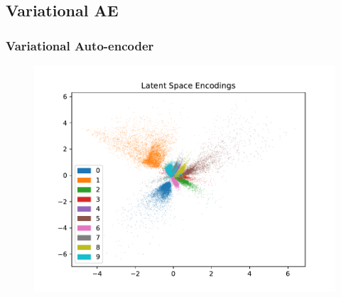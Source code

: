 \documentclass[10pt, usenames, dvipsnames, table]{beamer}
\begin{document}

\subsection{Variational AE}


\begin{frame}
  \frametitle{Variational Auto-encoder}
  \begin{figure}
    \centering
    \includegraphics[width=\linewidth]
    {models/mnist_vae_e300_L2_b64/encodings}
    \caption{}
    \label{}
  \end{figure}
\end{frame}
\end{document}
